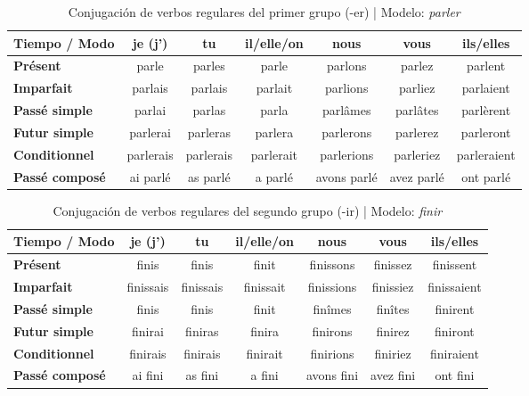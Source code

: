 \documentclass[a4paper, 12pt]{article}
\begin{document}
\begin{table}[htbp]
\centering
\caption{Conjugación de verbos regulares del primer grupo (-er) | Modelo: \textit{parler}}
\vspace{0.2cm} %
\begin{tabular}{lcccccc}
\toprule
\textbf{Tiempo / Modo} & \textbf{je (j')} & \textbf{tu} & \textbf{il/elle/on} & \textbf{nous} & \textbf{vous} & \textbf{ils/elles} \\
\midrule
\textbf{Présent} & parle & parles & parle & parlons & parlez & parlent \\
\textbf{Imparfait} & parlais & parlais & parlait & parlions & parliez & parlaient \\
\textbf{Passé simple} & parlai & parlas & parla & parlâmes & parlâtes & parlèrent \\
\textbf{Futur simple} & parlerai & parleras & parlera & parlerons & parlerez & parleront \\
\textbf{Conditionnel} & parlerais & parlerais & parlerait & parlerions & parleriez & parleraient \\
\textbf{Passé composé} & ai parlé & as parlé & a parlé & avons parlé & avez parlé & ont parlé \\
\bottomrule
\end{tabular}
\end{table}
\begin{table}[htbp]
\centering
\caption{Conjugación de verbos regulares del segundo grupo (-ir) | Modelo: \textit{finir}}
\vspace{0.2cm}
\begin{tabular}{lcccccc}
\toprule
\textbf{Tiempo / Modo} & \textbf{je (j')} & \textbf{tu} & \textbf{il/elle/on} & \textbf{nous} & \textbf{vous} & \textbf{ils/elles} \\
\midrule
\textbf{Présent} & finis & finis & finit & finissons & finissez & finissent \\
\textbf{Imparfait} & finissais & finissais & finissait & finissions & finissiez & finissaient \\
\textbf{Passé simple} & finis & finis & finit & finîmes & finîtes & finirent \\
\textbf{Futur simple} & finirai & finiras & finira & finirons & finirez & finiront \\
\textbf{Conditionnel} & finirais & finirais & finirait & finirions & finiriez & finiraient \\
\textbf{Passé composé} & ai fini & as fini & a fini & avons fini & avez fini & ont fini \\
\bottomrule
\end{tabular}
\end{table}
\end{document}
